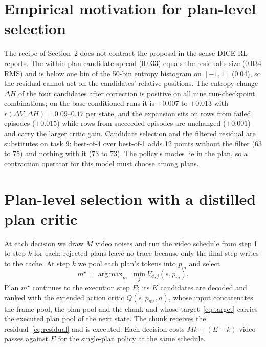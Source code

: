 \documentclass[10pt,twocolumn]{article}
\DeclareMathOperator*{\argmax}{arg\,max}
\begin{document}
\section{Empirical motivation for plan-level selection}

The recipe of Section~2 does not contract the proposal in the sense DICE-RL reports. The within-plan candidate spread (0.033) equals the residual's size (0.034 RMS) and is below one bin of the 50-bin entropy histogram on $[-1, 1]$ (0.04), so the residual cannot act on the candidates' relative positions. The entropy change $\Delta H$ of the four candidates after correction is positive on all nine run-checkpoint combinations; on the base-conditioned runs it is $+0.007$ to $+0.013$ with $r(\Delta V, \Delta H) = 0.09$--$0.17$ per state, and the expansion sits on rows from failed episodes ($+0.015$) while rows from succeeded episodes are unchanged ($+0.001$) and carry the larger critic gain. Candidate selection and the filtered residual are substitutes on task 9: best-of-4 over best-of-1 adds 12 points without the filter (63 to 75) and nothing with it (73 to 73). The policy's modes lie in the plan, so a contraction operator for this model must choose among plans.

\section{Plan-level selection with a distilled plan critic}

At each decision we draw $M$ video noises and run the video schedule from step 1 to step $k$ for each; rejected plans leave no trace because only the final step writes to the cache. At step $k$ we pool each plan's tokens into $p_m$ and select
\begin{equation}
m^\star = \argmax_{m} \; \min_{j} V_{\phi,j}(s, p_m).
\label{eq:select}
\end{equation}
Plan $m^\star$ continues to the execution step $E$; its $K$ candidates are decoded and ranked with the extended action critic $Q(s, p_{m^\star}, a)$, whose input concatenates the frame pool, the plan pool and the chunk and whose target~\eqref{eq:target} carries the executed plan pool of the next state. The chunk receives the residual~\eqref{eq:residual} and is executed. Each decision costs $M k + (E - k)$ video passes against $E$ for the single-plan policy at the same schedule.
\end{document}
